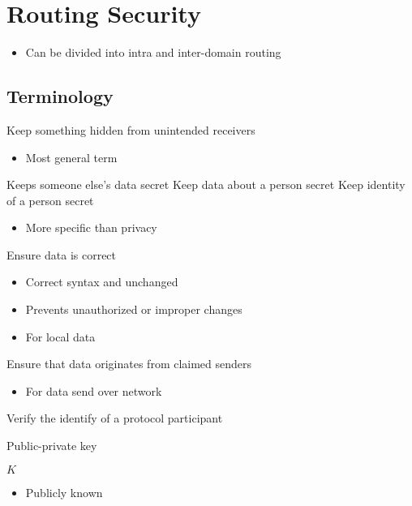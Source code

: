 
\section{Routing Security}
\begin{itemize}
    \item Can be divided into intra and inter-domain routing
\end{itemize}

\subsection{Terminology}
\begin{itemize}
     Keep something hidden from unintended receivers
        \begin{itemize}
            \item Most general term
        \end{itemize}
     Keeps someone else's data secret
     Keep data about a person secret
     Keep identity of a person secret
        \begin{itemize}
            \item More specific than privacy
        \end{itemize}
     Ensure data is correct
        \begin{itemize}
            \item Correct syntax and unchanged
            \item Prevents unauthorized or improper changes
            \item For local data
        \end{itemize}
     Ensure that data originates from claimed senders
        \begin{itemize}
            \item For data send over network
        \end{itemize}
     Verify the identify of a protocol participant
        \begin{itemize}
             Public-private key
                \begin{itemize}
                     $K$
                        \begin{itemize}
                            \item Publicly known

\end{itemize}
\end{itemize}
\end{itemize}
\end{itemize}
